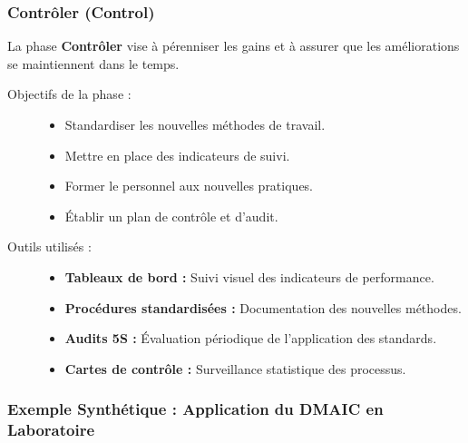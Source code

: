\documentclass[a4paper,12pt]{article}
\begin{document}
\subsubsection{Contrôler (Control)}

La phase \textbf{Contrôler} vise à pérenniser les gains et à assurer que les améliorations se maintiennent dans le temps.

\begin{description}
    \item[Objectifs de la phase :]
    \begin{itemize}
        \item Standardiser les nouvelles méthodes de travail.
        \item Mettre en place des indicateurs de suivi.
        \item Former le personnel aux nouvelles pratiques.
        \item Établir un plan de contrôle et d'audit.
    \end{itemize}
    
    \item[Outils utilisés :]
    \begin{itemize}
        \item \textbf{Tableaux de bord :} Suivi visuel des indicateurs de performance.
        \item \textbf{Procédures standardisées :} Documentation des nouvelles méthodes.
        \item \textbf{Audits 5S :} Évaluation périodique de l'application des standards.
        \item \textbf{Cartes de contrôle :} Surveillance statistique des processus.
    \end{itemize}
\end{description}

\begin{center}
\end{center}

\subsubsection{Exemple Synthétique : Application du DMAIC en Laboratoire}
\end{document}
